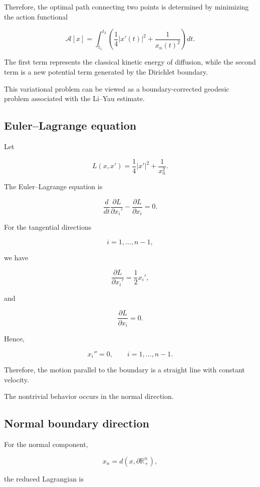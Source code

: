 \documentclass[10pt,a4paper]{amsart}
\begin{document}
Therefore, the optimal path connecting two points is determined by
minimizing the action functional

\[
\mathcal A[x]
=
\int_{t_1}^{t_2}
\left(
\frac14 |x'(t)|^2
+
\frac1{x_n(t)^2}
\right)dt .
\]


The first term represents the classical kinetic energy of diffusion,
while the second term is a new potential term generated by the
Dirichlet boundary.

This variational problem can be viewed as a boundary-corrected
geodesic problem associated with the Li--Yau estimate.



\subsection{Euler--Lagrange equation}


Let

\[
L(x,x')
=
\frac14|x'|^2+\frac1{x_n^2}.
\]


The Euler--Lagrange equation is

\[
\frac{d}{dt}
\frac{\partial L}{\partial x_i'}
-
\frac{\partial L}{\partial x_i}
=0.
\]


For the tangential directions

\[
i=1,\ldots,n-1,
\]

we have

\[
\frac{\partial L}{\partial x_i'}
=
\frac12 x_i',
\]

and

\[
\frac{\partial L}{\partial x_i}=0 .
\]

Hence,

\[
\boxed{
x_i''=0,
\qquad i=1,\ldots,n-1 .
}
\]


Therefore, the motion parallel to the boundary is a straight line
with constant velocity.

The nontrivial behavior occurs in the normal direction.



\subsection{Normal boundary direction}


For the normal component,

\[
x_n=d(x,\partial\mathbb R^n_+),
\]

the reduced Lagrangian is
\end{document}
